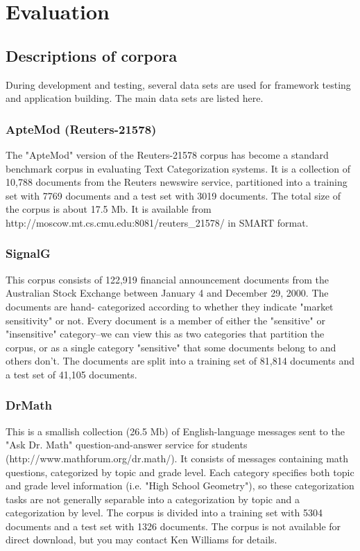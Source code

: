 \chapter{Evaluation}

\section{Descriptions of corpora}
During development and testing, several data sets are used for
framework testing and application building.  The main data sets are
listed here.


\subsection{ApteMod (Reuters-21578)}


The "ApteMod" version of the Reuters-21578 corpus has become a
standard benchmark corpus in evaluating Text Categorization systems.
It is a collection of 10,788 documents from the Reuters newswire
service, partitioned into a training set with 7769 documents and a
test set with 3019 documents.  The total size of the corpus is about
17.5 Mb.  It is available from
http://moscow.mt.cs.cmu.edu:8081/reuters\_21578/ in SMART format.


\subsection{SignalG}
This corpus consists of 122,919 financial announcement documents from
the Australian Stock Exchange between January 4 and December 29, 2000.
The documents are hand- categorized according to whether they indicate
"market sensitivity" or not.  Every document is a member of either the
"sensitive" or "insensitive" category--we can view this as two
categories that partition the corpus, or as a single category
"sensitive" that some documents belong to and others don't.  The
documents are split into a training set of 81,814 documents and a test
set of 41,105 documents.


\subsection{DrMath}
This is a smallish collection (26.5 Mb) of English-language messages
sent to the "Ask Dr. Math" question-and-answer service for students
(http://www.mathforum.org/dr.math/).  It consists of messages
containing math questions, categorized by topic and grade level.  Each
category specifies both topic and grade level information (i.e. "High
School Geometry"), so these categorization tasks are not generally
separable into a categorization by topic and a categorization by
level.  The corpus is divided into a training set with 5304 documents
and a test set with 1326 documents.  The corpus is not available for
direct download, but you may contact Ken Williams for details.


